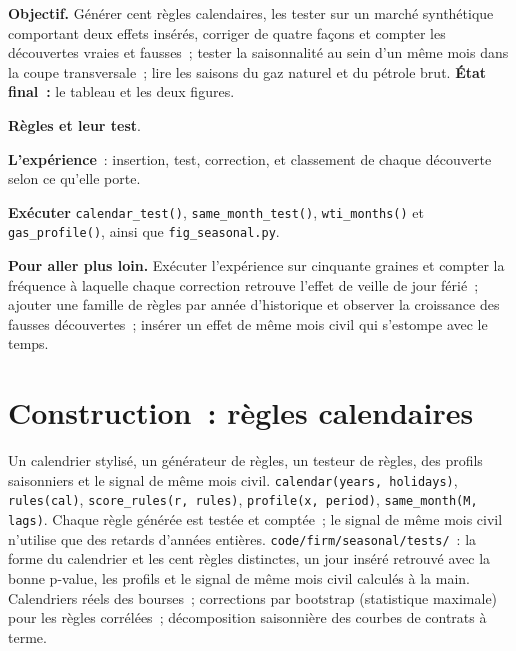 \begin{tutorial}
\textbf{Objectif.} Générer cent règles calendaires, les tester sur un marché synthétique comportant deux effets insérés, corriger de quatre façons et compter les découvertes vraies et fausses~;
tester la saisonnalité au sein d'un même mois dans la coupe transversale~; lire les saisons du gaz naturel et du pétrole brut. \textbf{État final~:} le tableau et les deux
figures.
\begin{tutsteps}
\item \textbf{Règles et leur test}.
\label{lst:s1:seasonality-and-calendar-effects:rules}
\item \textbf{L'expérience}~: insertion, test, correction, et classement de chaque découverte selon ce qu'elle porte.
\label{lst:s1:seasonality-and-calendar-effects:experiment}
\item \textbf{Exécuter} \texttt{calendar\_test()}, \texttt{same\_month\_test()}, \texttt{wti\_months()} et \texttt{gas\_profile()}, ainsi que \texttt{fig\_seasonal.py}.
\end{tutsteps}
\textbf{Pour aller plus loin.} Exécuter l'expérience sur cinquante graines et compter la fréquence à laquelle chaque correction retrouve l'effet de veille de jour férié~; ajouter une famille de règles par
année d'historique et observer la croissance des fausses découvertes~; insérer un effet de même mois civil qui s'estompe avec le temps.
\end{tutorial}

\section{Construction~: règles calendaires}\label{bld:s1:seasonality-and-calendar-effects:seasonal}

\begin{build}
 Un calendrier stylisé, un générateur de règles, un testeur de règles, des profils saisonniers et le signal de même mois civil.
 \texttt{calendar(years, holidays)}, \texttt{rules(cal)}, \texttt{score\_rules(r, rules)}, \texttt{profile(x, period)},
\texttt{same\_month(M, lags)}.
 Chaque règle générée est testée et comptée~; le signal de même mois civil n'utilise que des retards d'années entières.
 \texttt{code/firm/seasonal/tests/}~: la forme du calendrier et les cent règles distinctes, un jour inséré retrouvé avec la bonne
p-value, les profils et le signal de même mois civil calculés à la main.
 Calendriers réels des bourses~; corrections par bootstrap (statistique maximale) pour les règles corrélées~; décomposition saisonnière des courbes de contrats à terme.
\end{build}

